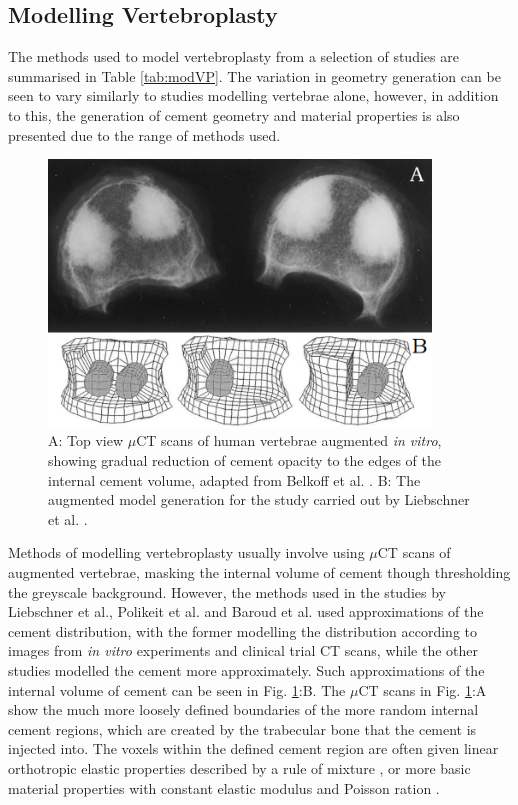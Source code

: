 \subsection{Modelling Vertebroplasty}

The methods used to model vertebroplasty from a selection of studies are
summarised in Table \ref{tab:modVP}. The variation in geometry
generation can be seen
to vary similarly to studies modelling vertebrae alone, however, in
addition to this, the generation of cement geometry and material
properties is also presented due to the range of methods used.

\begin{figure}[ht!]

\centering
  \includegraphics[width=4in]{images/VP_scan_vs_model_lit_rev.png}
  \caption{A: Top view $\mu$CT scans of human vertebrae augmented \textit{in vitro}, showing gradual reduction of cement opacity to the edges of the internal cement volume, adapted from Belkoff et al. \cite{belkoff2001biomechanics}. B: The augmented model generation for the study carried out by Liebschner et al. \cite{Liebschner2001}.}
\label{fig:VP_scan_vs_model_lit_rev}
\end{figure}

Methods of modelling vertebroplasty usually involve using $\mu$CT scans of
augmented vertebrae, masking the internal volume of cement though
thresholding the greyscale background. However, the methods used in the
studies by Liebschner et al., Polikeit et al. and Baroud et al.
\cite{Liebschner2001,Baroud2003,Polikeit2003} used approximations of the cement
distribution,
with
the former modelling the distribution according to images from \emph{in
vitro} experiments and clinical trial CT scans, while the other studies
modelled the cement more approximately. Such approximations of the internal volume of cement can be seen in Fig. \ref{fig:VP_scan_vs_model_lit_rev}:B. The $\mu$CT scans in Fig. \ref{fig:VP_scan_vs_model_lit_rev}:A show the much more loosely defined boundaries of the more random internal cement regions, which are created by the trabecular bone that the cement is injected into. The voxels within the defined
cement region are often given linear orthotropic elastic properties described
by a rule of mixture \cite{Chevalier2008}, or more basic material properties
with
constant elastic modulus and Poisson ration \cite{Wijayathunga2008,Liebschner2001,Baroud2003,Polikeit2003}.

